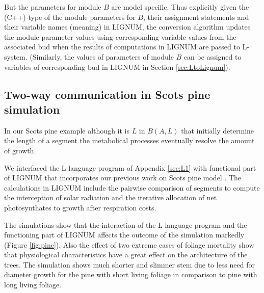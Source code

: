 But the parameters for module $B$ are model specific.  Thus explicitly
given  the  (C++)  type  of  the  module  parameters  for  $B$,  their
assignment statements  and their  variable names (meaning)  in LIGNUM,
the  conversion algorithm  updates the  module parameter  values using
corresponding variable values from the associated bud when the results
of  computations in  LIGNUM are  passed to  L-system.  (Similarly, the
values of  parameters of  module $B$ can  be assigned to  variables of
corresponding bud in LIGNUM in Section \ref{sec:LtoLignum}).

\subsection{Two-way communication in Scots pine simulation}

In  our  Scots  pine example  although  it  is  $L$ in  $B(A,L)$  that
initially determine the length  of a segment the metabolical processes
eventually resolve the amount of growth.
  
We  interfaced the L  language program  of Appendix  \ref{sec:L1} with
functional part of LIGNUM that incorporates our previous work on Scots
pine  model \citep{perttunen:96,  perttunen:98}.  The  calculations in
LIGNUM  include the  pairwise comparison  of segments  to  compute the
interception of  solar radiation and  the iterative allocation  of net
photosynthates to growth after respiration costs.

The simulations  show that the  interaction of the L  language program
and  the  functioning  part  of  LIGNUM affects  the  outcome  of  the
simulation markedly  (Figure \ref{fig:pine}).  Also the effect  of two
extreme   cases   of  foliage   mortality   show  that   physiological
characteristics have a great effect  on the architecture of the trees.
The simulation  shows much shorter and  slimmer stem due  to less need
for  diameter  growth  for  the  pine with  short  living  foliage  in
comparison to pine with long living foliage.

